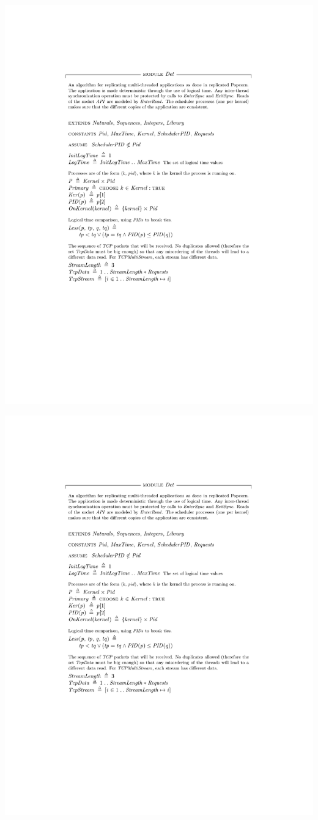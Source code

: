 \documentclass[12pt]{report}
\begin{document}
\begin{appendices}
\hspace{-2.5cm}\includegraphics[page=5,scale=1]{tla/Det.pdf}

\hspace{-2.5cm}\includegraphics[page=6,scale=1]{tla/Det.pdf}

\end{appendices}
\end{document}
